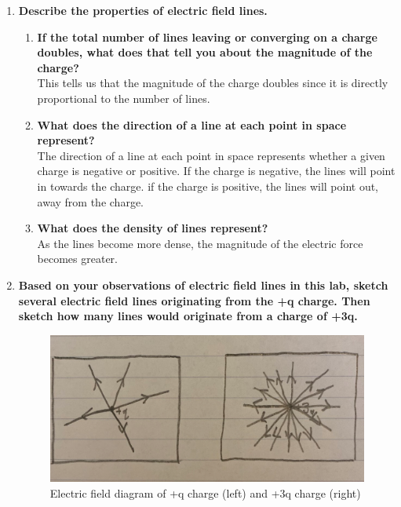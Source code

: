 \documentclass[oneside,12pt]{amsart}
\begin{document}
\begin{enumerate}
	\item \textbf{Describe the properties of electric field lines.}
	\begin{enumerate}
		\item \textbf{If the total number of lines leaving or converging on a charge doubles, what does that tell you about the magnitude of the charge?} \\
		\indent This tells us that the magnitude of the charge doubles since it is directly proportional to the number of lines.
		\item \textbf{What does the direction of a line at each point in space represent?}\\	
		\indent The direction of a line at each point in space represents whether a given charge is negative or positive. If the charge is negative, the lines will point in towards the charge. if the charge is positive, the lines will point out, away from the charge. 
		\item \textbf{What does the density of lines represent?}\\
		\indent As the lines become more dense, the magnitude of the electric force becomes greater.	
	\end{enumerate}
	\item \textbf{ Based on your observations of electric field lines in this lab, sketch several electric field lines originating from the +q charge. Then sketch how many lines would originate from a charge of +3q.}
	\begin{figure}[H]
		\includegraphics[width=\medgraph,scale=0.01]{Sketch.png}
		\caption{Electric field diagram of +q charge (left) and +3q charge (right)}
		\label{Sketch}
	\end{figure}

\end{enumerate}
\end{document}
